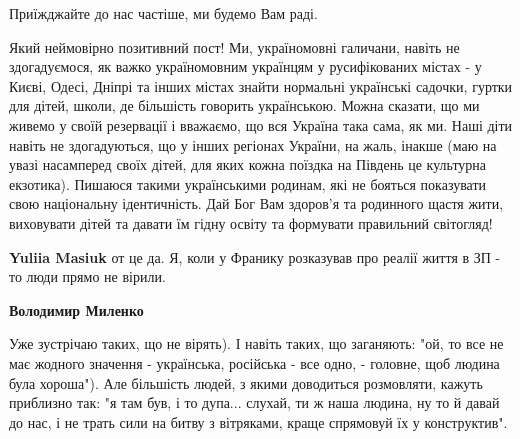\begin{itemize}
Приїжджайте до нас частіше, ми будемо Вам раді.


 

Який неймовірно позитивний пост! Ми, україномовні галичани, навіть не
здогадуємося, як важко україномовним українцям у русифікованих містах - у
Києві, Одесі, Дніпрі та інших містах знайти нормальні українські садочки,
гуртки для дітей, школи, де більшість говорить українською. Можна сказати, що
ми живемо у своїй резервації і вважаємо, що вся Україна така сама, як ми. Наші
діти навіть не здогадуються, що у інших регіонах України, на жаль, інакше (маю
на увазі насамперед своїх дітей, для яких кожна поїздка на Південь це культурна
екзотика). Пишаюся такими українськими родинам, які не бояться показувати свою
національну ідентичність. Дай Бог Вам здоров'я та родинного щастя жити,
виховувати дітей та давати їм гідну освіту та формувати правильний світогляд!

\begin{itemize}
 
\textbf{Yuliia Masiuk} от це да. Я, коли у Франику розказував про реалії життя в ЗП - то люди прямо не вірили.

 
\textbf{Володимир Миленко} 

Уже зустрічаю таких, що не вірять). І навіть таких, що заганяють: "ой, то все
не має жодного значення - українська, російська - все одно, - головне, щоб
людина була хороша"). Але більшість людей, з якими доводиться розмовляти,
кажуть приблизно так: "я там був, і то дупа... слухай, ти ж наша людина, ну то
й давай до нас, і не трать сили на битву з вітряками, краще спрямовуй їх у
конструктив".


 


\end{itemize}
\end{itemize}
